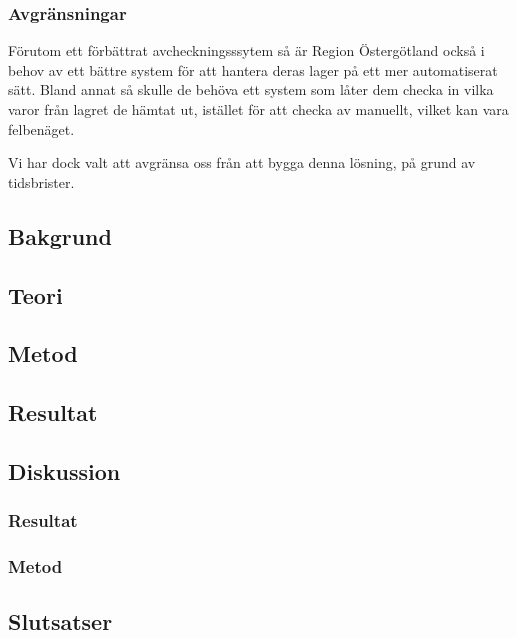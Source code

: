 \subsubsection{Avgränsningar}
Förutom ett förbättrat avcheckningsssytem så är Region Östergötland också i behov av
ett bättre system för att hantera deras lager på ett mer automatiserat sätt. %
Bland annat
så skulle de behöva ett system som låter dem checka in vilka varor från lagret de hämtat
ut, istället för att checka av manuellt, vilket kan vara felbenäget.

Vi har dock valt att avgränsa oss från att bygga denna lösning, på grund av tidsbrister.


\subsection{Bakgrund}


\subsection{Teori}

\subsection{Metod}
\subsection{Resultat}
\subsection{Diskussion}
\subsubsection{Resultat}
\subsubsection{Metod}
\subsection{Slutsatser}
